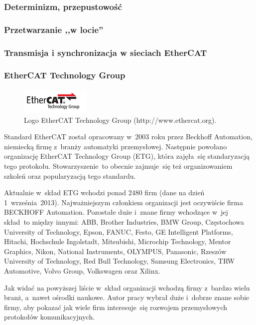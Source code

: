 \subsubsection{Determinizm, przepustowość}
\subsubsection{Przetwarzanie ,,w locie''}
\subsubsection{Transmisja i synchronizacja w sieciach EtherCAT}

\subsubsection{EtherCAT Technology Group}
\begin{figure}[!htb] 	\centering 	\includegraphics[width=0.3\textwidth]{images/logoETG} \caption{Logo EtherCAT Technology Group (http://www.ethercat.org).} \label{logoETG} \end{figure}

Standard EtherCAT został opracowany w~2003 roku przez Beckhoff Automation, niemiecką firmę z~branży automatyki przemysłowej. Następnie powołano organizację EtherCAT Technology Group (ETG), która zajęła~się standaryzacją tego protokołu. Stowarzyszenie~to obecnie zajmuje~się też organizowaniem szkoleń oraz popularyzacją tego standardu. 

Aktualnie w~skład ETG wchodzi ponad 2480 firm (dane na dzień 1~września~2013). Najważniejszym członkiem organizacji jest oczywiście firma BECKHOFF Automation. Pozostałe duże i~znane firmy wchodzące w~jej skład~to między innymi: ABB, Brother Industries, BMW Group, Częstochowa University of Technology, Epson, FANUC, Festo, GE Intelligent Platforms, Hitachi, Hochschule Ingolstadt, Mitsubishi, Microchip Technology, Mentor Graphics, Nikon, National Instruments, OLYMPUS, Panasonic, Rzeszów University of Technology, Red Bull Technology, Samsung Electronics, TRW Automotive, Volvo Group, Volkswagen oraz Xilinx.

Jak widać na powyższej liście w~skład organizacji wchodzą firmy z~bardzo wielu branż, a~nawet ośrodki naukowe. Autor pracy wybrał duże i~dobrze znane sobie firmy, aby pokazać jak wiele firm interesuje~się rozwojem przemysłowych protokołów komunikacyjnych.

